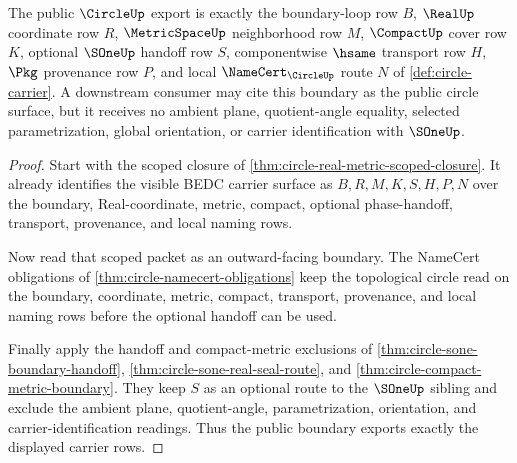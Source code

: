 \begin{theorem}
\label{thm:circle-public-boundary-export}
The public $\CircleUp$ export is exactly the boundary-loop row $B$, $\RealUp$ coordinate row $R$, $\MetricSpaceUp$ neighborhood row $M$, $\CompactUp$ cover row $K$, optional $\SOneUp$ handoff row $S$, componentwise $\hsame$ transport row $H$, $\Pkg$ provenance row $P$, and local $\NameCert_{\CircleUp}$ route $N$ of \autoref{def:circle-carrier}. A downstream consumer may cite this boundary as the public circle surface, but it receives no ambient plane, quotient-angle equality, selected parametrization, global orientation, or carrier identification with $\SOneUp$.
\end{theorem}
\begin{proof}
Start with the scoped closure of \autoref{thm:circle-real-metric-scoped-closure}. It already identifies the visible BEDC carrier surface as $B,R,M,K,S,H,P,N$ over the boundary, Real-coordinate, metric, compact, optional phase-handoff, transport, provenance, and local naming rows.

Now read that scoped packet as an outward-facing boundary. The NameCert obligations of \autoref{thm:circle-namecert-obligations} keep the topological circle read on the boundary, coordinate, metric, compact, transport, provenance, and local naming rows before the optional handoff can be used.

Finally apply the handoff and compact-metric exclusions of \autoref{thm:circle-sone-boundary-handoff}, \autoref{thm:circle-sone-real-seal-route}, and \autoref{thm:circle-compact-metric-boundary}. They keep $S$ as an optional route to the $\SOneUp$ sibling and exclude the ambient plane, quotient-angle, parametrization, orientation, and carrier-identification readings. Thus the public boundary exports exactly the displayed carrier rows.
\end{proof}


